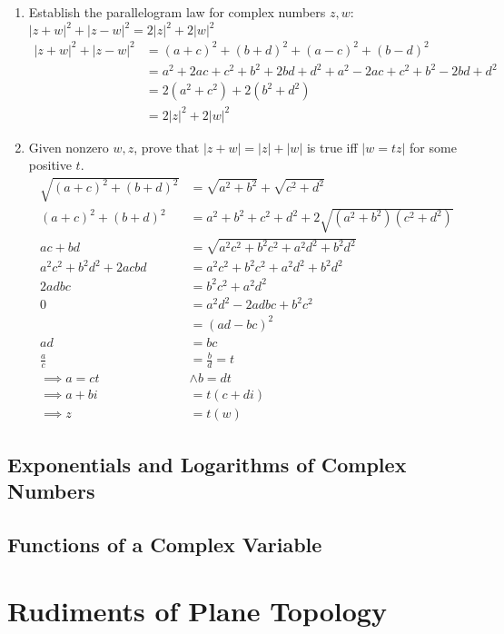 \documentclass[11pt, a4paper, latinreim, shortsets]{notes}
\begin{document}
\begin{enumerate}[label={\bfseries I.4.\arabic*}]
	\item Establish the parallelogram law for complex numbers $z,w$: $|z+w|^2 + |z-w|^2 = 2|z|^2 + 2|w|^2$
	\begin{align}
    |z+w|^2 + |z-w|^2 &= (a+c)^2 + (b+d)^2 + (a-c)^2 + (b-d)^2 \\
    &= a^2 + 2ac + c^2 + b^2 + 2bd + d^2 + a^2 -2ac + c^2 + b^2 -2bd + d^2 \\
    &= 2(a^2 + c^2) +2(b^2 + d^2) \\
    &= 2|z|^2 + 2|w|^2
	\end{align}

	\item Given nonzero $w,z$, prove that $|z+w|=|z|+|w|$ is true iff $|w=tz|$ for some positive $t$.
	\begin{align}
    \sqrt{(a+c)^2+(b+d)^2} &= \sqrt{a^2+b^2} + \sqrt{c^2 + d^2} \\
    (a+c)^2 + (b+d)^2 &= a^2 + b^2 + c^2 + d^2 + 2\sqrt{(a^2+b^2)(c^2+d^2)} \\
    ac + bd &= \sqrt{a^2c^2 +b^2c^2 + a^2d^2 + b^2d^2} \\
    a^2c^2 + b^2d^2 + 2acbd &= a^2c^2 + b^2c^2 + a^2d^2 + b^2d^2 \\
    2adbc &= b^2c^2 + a^2d^2 \\
    0 &= a^2d^2 - 2adbc + b^2c^2 \\
    &= (ad-bc)^2 \\
    ad &= bc \\
    \frac{a}{c} &= \frac{b}{d} = t \\
    \implies a = ct &\land b=dt \\
    \implies a+bi &= t(c+di) \\
    \implies z &= t(w)
	\end{align}
\end{enumerate}

\section{Exponentials and Logarithms of Complex Numbers}
\section{Functions of a Complex Variable}

\chapter{Rudiments of Plane Topology}
\end{document}
